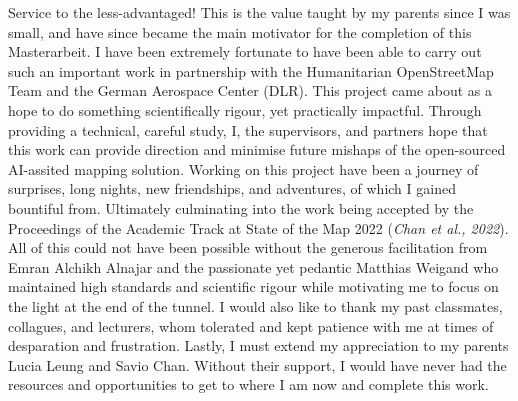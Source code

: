 \documentclass[11pt, a4paper, twoside]{report}
\begin{document}
Service to the less-advantaged! This is the value taught by my parents since I was small, and have since became the main motivator for the completion of this Masterarbeit. I have been extremely fortunate to have been able to carry out such an important work in partnership with the Humanitarian OpenStreetMap Team and the German Aerospace Center (DLR). This project came about as a hope to do something scientifically rigour, yet practically impactful. Through providing a technical, careful study, I, the supervisors, and partners hope that this work can provide direction and minimise future mishaps of the open-sourced AI-assited mapping solution. Working on this project have been a journey of surprises, long nights, new friendships, and adventures, of which I gained bountiful from. Ultimately culminating into the work being accepted by the Proceedings of the Academic Track at State of the Map 2022 (\textit{Chan et al., 2022}). All of this could not have been possible without the generous facilitation from Emran Alchikh Alnajar and the passionate yet pedantic Matthias Weigand who maintained high standards and scientific rigour while motivating me to focus on the light at the end of the tunnel. I would also like to thank my past classmates, collagues, and lecturers, whom tolerated and kept patience with me at times of desparation and frustration. Lastly, I must extend my appreciation to my parents Lucia Leung and Savio Chan. Without their support, I would have never had the resources and opportunities to get to where I am now and complete this work.

\newpage
\end{document}

